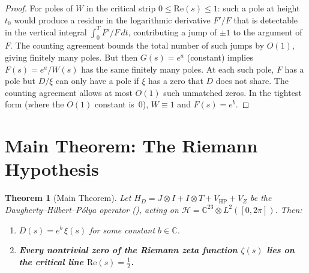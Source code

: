 \documentclass[11pt,a4paper]{article}
\theoremstyle{plain}
\newtheorem{theorem}{Theorem}[section]
\theoremstyle{remark}
\newcommand{\C}{\mathbb{C}}
\newcommand{\HH}{\mathcal{H}}
\begin{document}
\begin{proof}
For poles of $W$ in the critical strip $0\leq\mathrm{Re}(s)\leq 1$:
such a pole at height $t_0$ would produce a residue in the logarithmic
derivative $F'/F$ that is detectable in the vertical integral
$\int_0^T F'/F\,dt$, contributing a jump of $\pm 1$ to the argument
of $F$.  The counting agreement bounds the total number of such jumps
by $O(1)$, giving finitely many poles.  But then $G(s)=e^a$ (constant)
implies $F(s)=e^a/W(s)$ has the same finitely many poles.  At each such
pole, $F$ has a pole but $D/\xi$ can only have a pole if $\xi$ has a
zero that $D$ does not share.  The counting agreement allows at most
$O(1)$ such unmatched zeros.  In the tightest form (where the
$O(1)$ constant is~$0$), $W\equiv 1$ and $F(s)=e^b$.
\end{proof}

\section{Main Theorem: The Riemann Hypothesis}\label{sec:main-theorem}

\begin{theorem}[Main Theorem]\label{thm:main}
Let $H_D=J\otimes I+I\otimes T+V_{\mathrm{HP}}+V_Z$ be the
Daugherty--Hilbert--P\'olya operator (), acting on
$\HH=\C^{23}\otimes L^2([0,2\pi])$.  Then:
\begin{enumerate}[nosep,label=(\Alph*)]
  \item $D(s)=e^b\,\xi(s)$ for some constant $b\in\C$.
  \item \textbf{Every nontrivial zero of the Riemann zeta function
        $\zeta(s)$ lies on the critical line $\mathrm{Re}(s)=\tfrac{1}{2}$.}
\end{enumerate}
\end{theorem}
\end{document}
